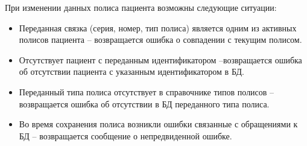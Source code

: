 При изменении данных полиса пациента возможны следующие ситуации:
\begin{itemize}
 \item Переданная связка (серия, номер, тип полиса) является одним из активных полисов пациента – возвращается ошибка о совпадении с текущим полисом.
 \item Отсутствует пациент с переданным идентификатором –возвращается ошибка об отсутствии пациента с указанным идентификатором в БД.
 \item Переданный типа полиса отсутствует в справочнике типов полисов – возвращается ошибка об отсутствии в БД переданного типа полиса.
 \item Во время сохранения полиса возникли ошибки связанные с обращениями к БД – возвращается сообщение о непредвиденной ошибке.
\end{itemize}

